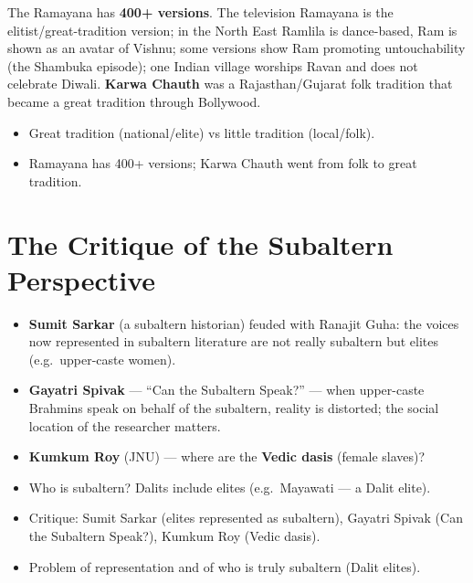 \begin{ExampleBox}
The Ramayana has \textbf{400+ versions}. The television Ramayana is the elitist/great-tradition version; in the North East Ramlila is dance-based, Ram is shown as an avatar of Vishnu; some versions show Ram promoting untouchability (the Shambuka episode); one Indian village worships Ravan and does not celebrate Diwali. \textbf{Karwa Chauth} was a Rajasthan/Gujarat folk tradition that became a great tradition through Bollywood.
\end{ExampleBox}

\begin{QuickRevision}
\begin{itemize}
\item Great tradition (national/elite) vs little tradition (local/folk).
\item Ramayana has 400+ versions; Karwa Chauth went from folk to great tradition.
\end{itemize}
\end{QuickRevision}

\section{The Critique of the Subaltern Perspective}

\begin{itemize}
\item \textbf{Sumit Sarkar} (a subaltern historian) feuded with Ranajit Guha: the voices now represented in subaltern literature are not really subaltern but elites (e.g.\ upper-caste women).
\item \textbf{Gayatri Spivak} --- ``Can the Subaltern Speak?'' --- when upper-caste Brahmins speak on behalf of the subaltern, reality is distorted; the social location of the researcher matters.
\item \textbf{Kumkum Roy} (JNU) --- where are the \textbf{Vedic dasis} (female slaves)?
\item Who is subaltern? Dalits include elites (e.g.\ Mayawati --- a Dalit elite).
\end{itemize}

\begin{QuickRevision}
\begin{itemize}
\item Critique: Sumit Sarkar (elites represented as subaltern), Gayatri Spivak (Can the Subaltern Speak?), Kumkum Roy (Vedic dasis).
\item Problem of representation and of who is truly subaltern (Dalit elites).
\end{itemize}
\end{QuickRevision}
